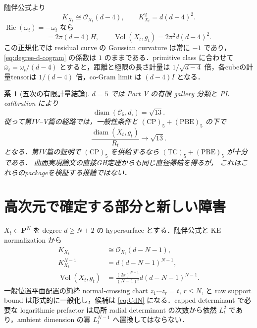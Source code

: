 \documentclass[a4paper,11pt]{ltjsarticle}
\numberwithin{equation}{section}
\theoremstyle{plain}
\newtheorem{corollary}[theorem]{系}
\theoremstyle{definition}
\theoremstyle{remark}
\newcommand{\PP}{\mathbf P}
\newcommand{\cC}{\mathcal C}
\newcommand{\Ric}{\operatorname{Ric}}
\newcommand{\diam}{\operatorname{diam}}
\newcommand{\Vol}{\operatorname{Vol}}
\newcommand{\Lt}{L_t}
\newcommand{\Rt}{R_t}
\begin{document}
随伴公式より
\begin{equation}
 K_{X_t}\cong\mathcal O_{X_t}(d-4),\qquad
 K_{X_t}^2=d(d-4)^2.
\label{eq:surface-adjunction}
\end{equation}
\(\Ric(\omega_t)=-\omega_t\) なら
\begin{equation}
 [\omega_t]=2\pi(d-4)H,\qquad
 \Vol(X_t,g_t)=2\pi^2d(d-4)^2.
\label{eq:surface-volume}
\end{equation}
この正規化では residual curve の Gaussian curvature は常に \(-1\) であり，\eqref{eq:degree-d-cogram} の係数は \(1\) のままである．primitive class に合わせて \(\bar\omega_t=\omega_t/(d-4)\) とすると，距離と極限の長さ計量は \(1/\sqrt{d-4}\) 倍，各cubeの計量tensorは \(1/(d-4)\) 倍，co-Gram limit は \((d-4)I\) となる．

\begin{corollary}[五次の有限計量結論]
\(d=5\) では Part V の有限 gallery 分類と PL calibration により
\begin{equation}
 \diam(\cC_5,d_\square)=\sqrt{13}.
\label{eq:C5-diameter}
\end{equation}
従って第IV--V篇の経路では，一般性条件と
\(\mathrm{(CP)}_5+\mathrm{(PBE)}_5\) の下で
\[
 \frac{\diam(X_t,g_t)}{\Rt}\longrightarrow\sqrt{13}.
\]
となる．第IV篇の証明で \(\mathrm{(CP)}_5\) を供給するなら
\(\mathrm{(TC)}_5+\mathrm{(PBE)}_5\) が十分である．
曲面実現論文の直接GH定理からも同じ直径帰結を得るが，
これはこれらのpackageを検証する推論ではない．
\end{corollary}

\section{高次元で確定する部分と新しい障害}

\(X_t\subset\PP^N\) を degree \(d\ge N+2\) の hypersurface とする．随伴公式と KE normalization から
\begin{align}
 K_{X_t}&\cong\mathcal O_{X_t}(d-N-1),\label{eq:high-adjunction}\\
 K_{X_t}^{N-1}&=d(d-N-1)^{N-1},\label{eq:high-canonical-volume}\\
 \Vol(X_t,g_t)&=
 \frac{(2\pi)^{N-1}}{(N-1)!}
 d(d-N-1)^{N-1}.
\label{eq:high-volume}
\end{align}
一般位置平面配置の純粋 normal-crossing chart \(z_1\cdots z_r=t\), \(r\le N\), と raw support bound は形式的に一般化し，候補は \eqref{eq:CdN} になる．capped determinant で必要な logarithmic prefactor は局所 radial determinant の次数から依然 \(\Lt^2\) であり，ambient dimension の冪 \(\Lt^{N-1}\) へ置換してはならない．
\end{document}
